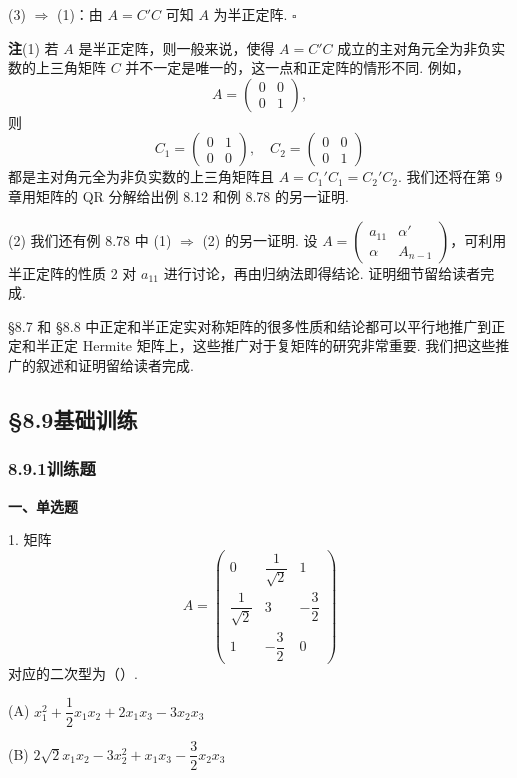\documentclass[UTF8, 12pt, fontset=fandol, oneside]{ctexart}
\begin{document}
(3) $\Rightarrow$ (1)：由 $A=C'C$ 可知 $A$ 为半正定阵. $\ensuremath{\square}$

\noindent\textbf{注}\quad (1) 若 $A$ 是半正定阵，则一般来说，使得 $A=C'C$ 成立的主对角元全为非负实数的上三角矩阵 $C$ 并不一定是唯一的，这一点和正定阵的情形不同. 例如，
\[
A=\left(\begin{array}{cc}0&0\\ 0&1\end{array}\right),
\]
则
\[
C_1=\left(\begin{array}{cc}0&1\\ 0&0\end{array}\right),\quad
C_2=\left(\begin{array}{cc}0&0\\ 0&1\end{array}\right)
\]
都是主对角元全为非负实数的上三角矩阵且 $A=C_1'C_1=C_2'C_2$. 我们还将在第 9 章用矩阵的 QR 分解给出例 8.12 和例 8.78 的另一证明.

(2) 我们还有例 8.78 中 (1) $\Rightarrow$ (2) 的另一证明. 设 $A=\left(\begin{array}{cc}a_{11}&\alpha'\\ \alpha&A_{n-1}\end{array}\right)$，可利用半正定阵的性质 2 对 $a_{11}$ 进行讨论，再由归纳法即得结论. 证明细节留给读者完成.

§8.7 和 §8.8 中正定和半正定实对称矩阵的很多性质和结论都可以平行地推广到正定和半正定 Hermite 矩阵上，这些推广对于复矩阵的研究非常重要. 我们把这些推广的叙述和证明留给读者完成.

\subsection*{§8.9\quad 基础训练}

\subsubsection*{8.9.1\quad 训练题}

\noindent\textbf{一、单选题}

1. 矩阵
\[
A=\left(\begin{array}{ccc}
0 & \dfrac1{\sqrt2} & 1\\
\dfrac1{\sqrt2} & 3 & -\dfrac32\\
1 & -\dfrac32 & 0
\end{array}\right)
\]
对应的二次型为（\quad ）.

(A) $x_1^2+\dfrac12x_1x_2+2x_1x_3-3x_2x_3$

(B) $2\sqrt2x_1x_2-3x_2^2+x_1x_3-\dfrac32x_2x_3$
\end{document}
